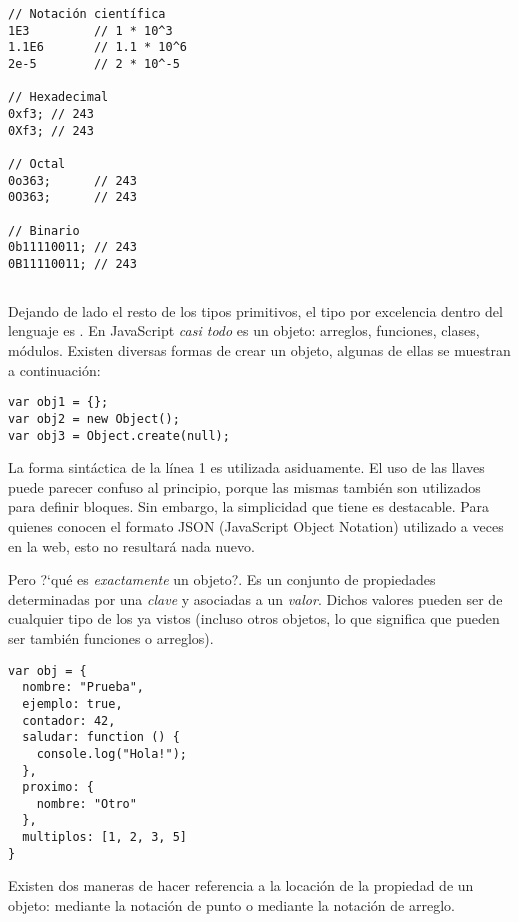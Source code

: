 \begin{lstlisting}
// Notación científica
1E3			// 1 * 10^3
1.1E6		// 1.1 * 10^6
2e-5		// 2 * 10^-5

// Hexadecimal
0xf3; // 243
0Xf3; // 243

// Octal
0o363;		// 243
0O363;		// 243

// Binario
0b11110011;	// 243
0B11110011; // 243
\end{lstlisting}

\subsection{}

Dejando de lado el resto de los tipos primitivos, el tipo por excelencia dentro del lenguaje es . En JavaScript \textit{casi todo} es un objeto: arreglos, funciones, clases, módulos. Existen diversas formas de crear un objeto, algunas de ellas se muestran a continuación:

\begin{lstlisting}[title={Creando un \code{object}}]
var obj1 = {};
var obj2 = new Object();
var obj3 = Object.create(null);
\end{lstlisting}

La forma sintáctica de la línea 1 es utilizada asiduamente. El uso de las llaves \code{\{\}} puede parecer confuso al principio, porque las mismas también son utilizados para definir bloques. Sin embargo, la simplicidad que tiene es destacable. Para quienes conocen el formato JSON (JavaScript Object Notation) utilizado a veces en la web, esto no resultará nada nuevo.

Pero ?`qué es \textit{exactamente} un objeto?. Es un conjunto de propiedades determinadas por una \textit{clave} y asociadas a un \textit{valor}. Dichos valores pueden ser de cualquier tipo de los ya vistos (incluso otros objetos, lo que significa que pueden ser también funciones o arreglos).

\begin{lstlisting}[title={Ejemplo de \code{object}}]
var obj = {
  nombre: "Prueba",
  ejemplo: true,
  contador: 42,
  saludar: function () {
    console.log("Hola!");
  },
  proximo: {
    nombre: "Otro"
  },
  multiplos: [1, 2, 3, 5]
}
\end{lstlisting}

Existen dos maneras de hacer referencia a la locación de la propiedad de un objeto: mediante la notación de punto o mediante la notación de arreglo. 

